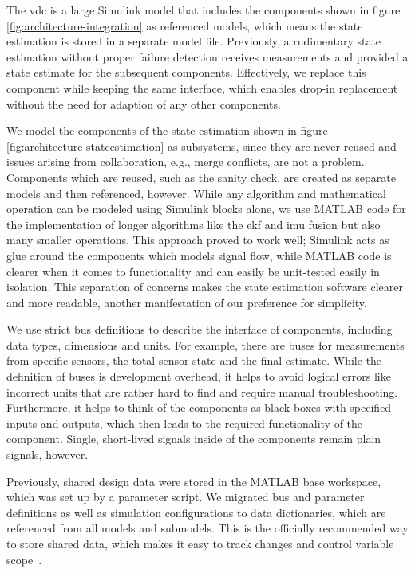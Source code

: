 The \gls{vdc} is a large Simulink model that includes the components shown in figure \ref{fig:architecture-integration} as referenced models, which means the state estimation is stored in a separate model file. Previously, a rudimentary state estimation without proper failure detection receives measurements and provided a state estimate for the subsequent components. Effectively, we replace this component while keeping the same interface, which enables drop-in replacement without the need for adaption of any other components.

We model the components of the state estimation shown in figure \ref{fig:architecture-stateestimation} as subsystems, since they are never reused and issues arising from collaboration, e.g., merge conflicts, are not a problem. Components which are reused, such as the sanity check, are created as separate models and then referenced, however. While any algorithm and mathematical operation can be modeled using Simulink blocks alone, we use MATLAB code for the implementation of longer algorithms like the \gls{ekf} and \gls{imu} fusion but also many smaller operations. This approach proved to work well; Simulink acts as glue around the components which models signal flow, while MATLAB code is clearer when it comes to functionality and can easily be unit-tested easily in isolation. This separation of concerns makes the state estimation software clearer and more readable, another manifestation of our preference for simplicity.

We use strict bus definitions to describe the interface of components, including data types, dimensions and units. For example, there are buses for measurements from specific sensors, the total sensor state and the final estimate. While the definition of buses is development overhead, it helps to avoid logical errors like incorrect units that are rather hard to find and require manual troubleshooting. Furthermore, it helps to think of the components as black boxes with specified inputs and outputs, which then leads to the required functionality of the component. Single, short-lived signals inside of the components remain plain signals, however.

Previously, shared design data were stored in the MATLAB base workspace, which was set up by a parameter script. We migrated bus and parameter definitions as well as simulation configurations to data dictionaries, which are referenced from all models and submodels. This is the officially recommended way to store shared data, which makes it easy to track changes and control variable scope~\cite{TheMathWorksInc..2020b}.

